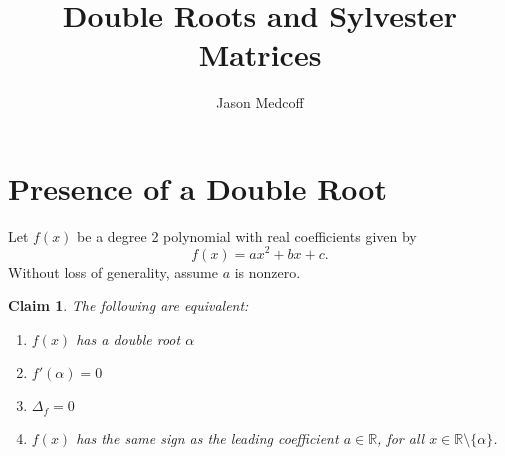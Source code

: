 \documentclass[12pt]{amsart}
\title{Double Roots and Sylvester Matrices}
\author{Jason Medcoff}
\newtheorem{clm}{Claim}
\theoremstyle{case}
\begin{document}
	
	\maketitle
	
	\section{Presence of a Double Root}
	
	Let $f(x)$ be a degree 2 polynomial with real coefficients given by
	$$ f(x) = ax^2 + bx + c . $$
	Without loss of generality, assume $a$ is nonzero.
	
	\begin{clm}
		The following are equivalent:
		\begin{enumerate}[label=(\roman*)]
			\item $f(x)$ has a double root $\alpha$
			\item $f'(\alpha) = 0$
			\item $\Delta_f = 0$
			\item $f(x)$ has the same sign as the leading coefficient $a \in \mathbb{R}$, for all $x \in \mathbb{R} \setminus \{\alpha\}$.
		\end{enumerate}
	\end{clm}
	
\end{document}
